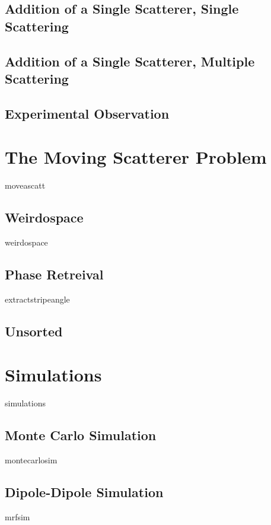 \documentclass[a4paper,titlepage,onecolumn]{report}
\begin{document}
  \subsection{Addition of a Single Scatterer, Single Scattering}
  \subsection{Addition of a Single Scatterer, Multiple Scattering}
  \subsection{Experimental Observation}
 \section{The Moving Scatterer Problem}
	{moveascatt}
  \subsection{Weirdospace}
		{weirdospace}
		\subsection{Phase Retreival}
		{extractstripeangle}
  \subsection{Unsorted}
 \section{Simulations}
	{simulations}
	\subsection{Monte Carlo Simulation} \label{sec:montecarlo}
		{montecarlosim}
  \subsection{Dipole-Dipole Simulation} \label{sec:mrfsim}
		{mrfsim}
\end{document}
